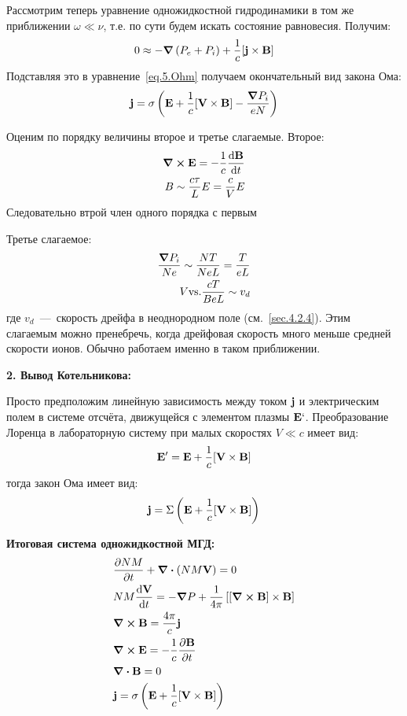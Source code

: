 \documentclass[10pt, a4paper]{article}
\numberwithin{equation}{section}
\begin{document}
Рассмотрим теперь уравнение одножидкостной гидродинамики в том же приближении $\omega \ll \nu$, т.е. по сути будем искать состояние равновесия. Получим:
\begin{equation}
	0 \approx -\grad{\left( P_e + P_i \right)} + \frac{1}{c}[\vb{j}\times\vb{B}]
\end{equation}
Подставляя это в уравнение~\eqref{eq.5.Ohm} получаем окончательный вид закона Ома:
\begin{equation}
	\vb{j} = \sigma \left( \vb{E} + \frac{1}{c}[\vb{V}\times\vb{B}] - \frac{\grad{P_i}}{eN} \right)
\end{equation}

Оценим по порядку величины второе и третье слагаемые.
Второе:
\begin{align*}
	\curl\vb{E} = -\frac{1}{c}\dv{\vb{B}}{t} \\
	B \sim \frac{c\tau}{L} E = \frac{c}{V} E
\end{align*}
Следовательно втрой член одного порядка с первым

Третье слагаемое:
\begin{align*}
	\frac{\grad P_i}{N e} \sim \frac{N T}{N e L} = \frac{T}{eL} \\
	V \text{vs.} \frac{cT}{BeL} \sim v_{d}
\end{align*}
где $v_{d}$~---~скорость дрейфа в неоднородном поле (см.~\ref{sec.4.2.4}). Этим слагаемым можно пренебречь, когда дрейфовая скорость много меньше средней скорости ионов. Обычно работаем именно в таком приближении.

\textbf{2. Вывод Котельникова:} 

Просто предположим линейную зависимость между током $\vb{j}$ и электрическим полем в системе отсчёта, движущейся с элементом плазмы $\vb{E}`$. Преобразование Лоренца в лабораторную систему при малых скоростях $V \ll c$ имеет вид:
\begin{equation}
	\vb{E}' = \vb{E} + \frac{1}{c}[\vb{V}\times \vb{B}]
\end{equation}
тогда закон Ома имеет вид:
\begin{equation}
	\vb{j} = \Sigma\left( \vb{E} + \frac{1}{c}[\vb{V}\times \vb{B}] \right)
\end{equation}

\textbf{Итоговая система одножидкостной МГД:}
\begin{align}
	\label{eq.5.mgd1}
	&\pdv{NM}{t} + \divergence{\left( NM\vb{V} \right)} = 0 \\
	\label{eq.5.mgd2}
	&N M \dv{\vb{V}}{t} = -\grad{P} + \frac{1}{4\pi}\left[\left[ \curl{\vb{B}} \right]\times\vb{B}\right] \\
	\label{eq.5.mgd3}
	&\curl{\vb{B}} = \frac{4\pi}{c}\vb{j} \\
	\label{eq.5.mgd4}
	&\curl{\vb{E}} = -\frac{1}{c}\pdv{\vb{B}}{t} \\
	\label{eq.5.mgd5}
	&\divergence{\vb{B}} = 0 \\
	\label{eq.5.mgd6}
	&\vb{j} = \sigma\left( \vb{E} + \frac{1}{c}[\vb{V}\times\vb{B}] \right)
\end{align}
\end{document}
